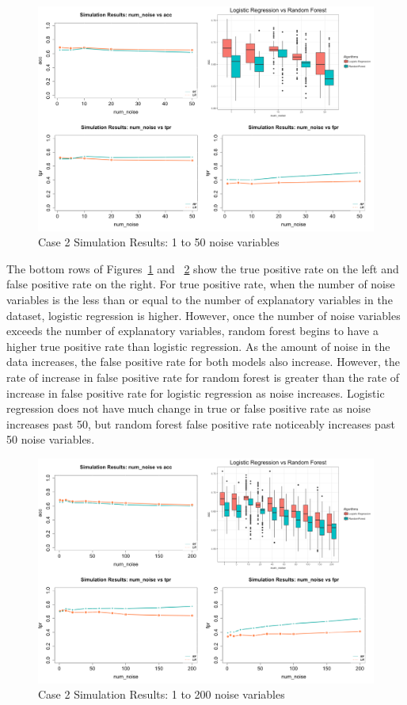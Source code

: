 \documentclass{llncs}
\begin{document}
\begin{figure}
\centering
\includegraphics[scale=0.55]{case2.png}
\caption{Case 2 Simulation Results: 1 to 50 noise variables}
\label{fig:case2results}
\end{figure}

\noindent 
The bottom rows of Figures~\ref{fig:case2results} and ~\ref{fig:case2resultsb} show the true positive rate on the left and false positive rate on the right.  For true positive rate, when the number of noise variables is the less than or equal to the number of explanatory variables in the dataset, logistic regression is higher.  However, once the number of noise variables exceeds the number of explanatory variables, random forest begins to have a higher true positive rate than logistic regression.  As the amount of noise in the data increases, the false positive rate for both models also increase.  However, the rate of increase in false positive rate for random forest is greater than the rate of increase in false positive rate for logistic regression as noise increases.  Logistic regression does not have much change in true or false positive rate as noise increases past 50, but random forest false positive rate noticeably increases past 50 noise variables.

\begin{figure}
\centering
\includegraphics[scale=0.55]{case2_b.png}
\caption{Case 2 Simulation Results: 1 to 200 noise variables}
\label{fig:case2resultsb}
\end{figure}
\end{document}
